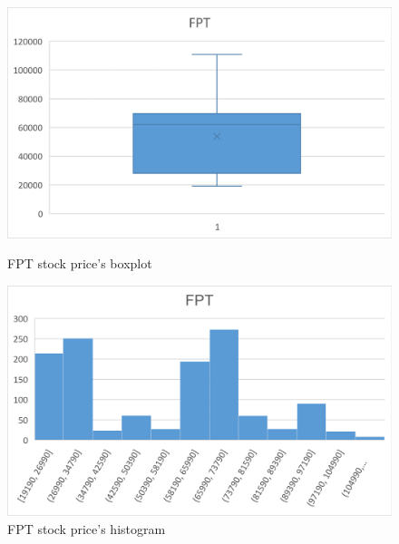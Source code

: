 \documentclass{ieeeojies}
\begin{document}
\begin{figure}[H]
    \centering
    \begin{minipage}{0.23\textwidth}
        \centering
        \includegraphics[width=1\textwidth]{bibliography/Figure/FPT_Quantiles.png}
        \caption{FPT stock price's boxplot}
        \label{fig:1}
    \end{minipage}
    \hfill
    \begin{minipage}{0.23\textwidth}
        \centering
        \includegraphics[width=1\textwidth]{bibliography/Figure/FPT_Bar.png}
        \caption{FPT stock price's histogram}
        \label{fig:2}
    \end{minipage}
\end{figure}
\end{document}
